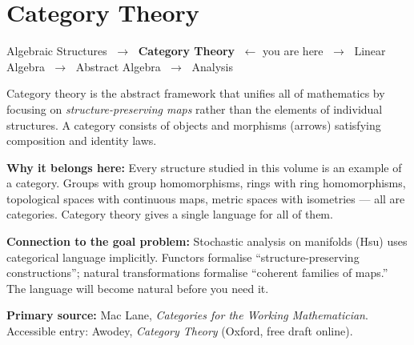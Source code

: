 \chapter{Category Theory}

\begin{tcolorbox}[
  colback=gray!6,
  colframe=gray!40,
  arc=2pt,
  left=8pt, right=8pt, top=6pt, bottom=6pt,
  title={\small\textbf{Where You Are in the Journey}},
  fonttitle=\small\bfseries
]
\begin{center}
\small
Algebraic Structures
$\;\to\;$ \textbf{Category Theory} $\;\leftarrow$ you are here
$\;\to\;$ Linear Algebra
$\;\to\;$ Abstract Algebra
$\;\to\;$ Analysis
\end{center}
\end{tcolorbox}

\vspace{0.5em}

\begin{tcolorbox}[
  colback=blue!4,
  colframe=blue!30,
  arc=2pt,
  left=8pt, right=8pt, top=6pt, bottom=6pt,
  title={\small\textbf{Chapter Overview}},
  fonttitle=\small\bfseries
]
\small
Category theory is the abstract framework that unifies all of mathematics
by focusing on \emph{structure-preserving maps} rather than the elements
of individual structures.
A category consists of objects and morphisms (arrows) satisfying
composition and identity laws.

\medskip
\textbf{Why it belongs here:}
Every structure studied in this volume is an example of a category.
Groups with group homomorphisms, rings with ring homomorphisms,
topological spaces with continuous maps, metric spaces with
isometries --- all are categories.
Category theory gives a single language for all of them.

\medskip
\textbf{Connection to the goal problem:}
Stochastic analysis on manifolds (Hsu) uses categorical language implicitly.
Functors formalise ``structure-preserving constructions'';
natural transformations formalise ``coherent families of maps.''
The language will become natural before you need it.

\medskip
\textbf{Primary source:} Mac Lane, \textit{Categories for the Working Mathematician}.
Accessible entry: Awodey, \textit{Category Theory} (Oxford, free draft online).
\end{tcolorbox}

